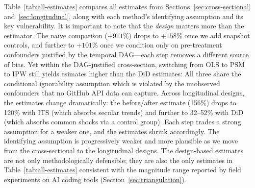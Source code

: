 Table~\ref{tab:all-estimates} compares all estimates from Sections~\ref{sec:cross-sectional} and~\ref{sec:longitudinal}, along with each method's identifying assumption and its key vulnerability.
It is important to note that the \emph{design} matters more than the estimator.
The na\"ive comparison ($+911\%$) drops to $+158\%$ once we add snapshot controls, and further to $+101\%$ once we condition only on pre-treatment confounders justified by the temporal DAG---each step removes a different source of bias.
Yet within the DAG-justified cross-section, switching from OLS to PSM to IPW still yields esimates higher than the DiD estimates: All three share the conditional ignorability assumption which is violated by the unobserved confounders that no GitHub API data can capture.
Across longitudinal designs, the estimates change dramatically: the before/after estimate (156\%) drops to 120\% with ITS (which absorbs secular trends) and further to 32--52\% with DiD (which absorbs common shocks via a control group).
Each step trades a strong assumption for a weaker one, and the estimates shrink accordingly.
The identifying assumption is progressively weaker and more plausible as we move from the cross-sectional to the longitudinal designs.
The design-based estimates are not only methodologically defensible; they are also the only estimates in Table~\ref{tab:all-estimates} consistent with the magnitude range reported by field experiments on AI coding tools (Section~\ref{sec:triangulation}).
